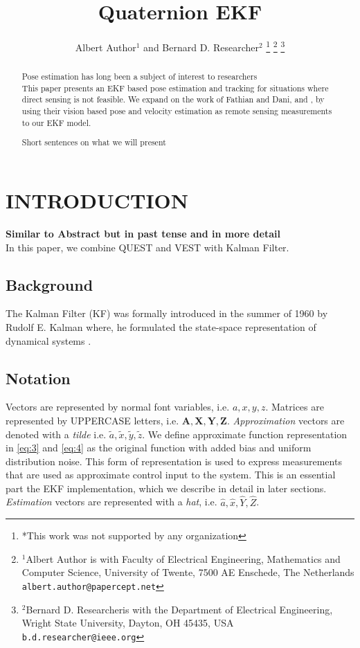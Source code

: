 \documentclass[letterpaper, 10 pt, conference]{ieeeconf}  %
\title{\LARGE \bf Quaternion EKF }
\author{Albert Author$^{1}$ and Bernard D. Researcher$^{2}$%
\thanks{*This work was not supported by any organization}%
\thanks{$^{1}$Albert Author is with Faculty of Electrical Engineering, Mathematics and Computer Science,
        University of Twente, 7500 AE Enschede, The Netherlands
        {\tt\small albert.author@papercept.net}}%
\thanks{$^{2}$Bernard D. Researcheris with the Department of Electrical Engineering, Wright State University,
        Dayton, OH 45435, USA
        {\tt\small b.d.researcher@ieee.org}}%
}
\begin{document}
\maketitle
\thispagestyle{empty}
\pagestyle{empty}


\begin{abstract}

Pose estimation has long been a subject of interest to researchers\\

This paper presents an EKF based pose estimation and tracking for situations where direct sensing is not feasible. We expand on the work of Fathian and Dani, \cite{quest} and \cite{vest}, by using their vision based pose and velocity estimation as remote sensing measurements to our EKF model.


Short sentences on what we will present

\end{abstract}


\section{INTRODUCTION}

\textbf{Similar to Abstract but in past tense and in more detail}\\

In this paper, we combine QUEST and VEST with Kalman Filter.\\

\subsection{Background}

The Kalman Filter (KF) was formally introduced in the summer of 1960 by Rudolf E. Kalman where, he formulated the state-space representation of dynamical systems \cite{KF}.




\subsection{Notation}
Vectors are represented by normal font variables, i.e. $a,x,y,z$.
Matrices are represented by UPPERCASE letters, i.e. $\mathbf{A,X,Y,Z}$.
\textit{Approximation} vectors are denoted with a \textit{tilde} i.e. $\widetilde{a},\widetilde{x},\widetilde{y},\widetilde{z}$.
We define approximate function representation
in \ref{eq:3} and \ref{eq:4} as the original function with added bias and uniform distribution noise.
This form of representation is used to express measurements that
are used as approximate control input to the system. This is an essential part the EKF
implementation, which we describe in detail in later sections.
\textit{Estimation} vectors are represented with a \textit{hat}, i.e. $\widehat{a},\widehat{x},\widehat{Y},\widehat{Z}$.
\end{document}
